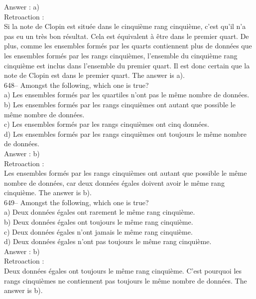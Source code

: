 ﻿\documentclass[letterpaper, 12pt]{article}
\begin{document}
Answer : a)\\

Retroaction : \\
Si la note de Clopin est situ\'ee dans le cinqui\`eme rang cinqui\`eme,
c'est qu'il n'a pas eu un tr\`es bon r\'esultat.  Cela est \'equivalent \`a
\^etre dans le premier quart.  De plus, comme les ensembles form\'es par les
quarts contiennent plus de donn\'ees que les ensembles form\'es par les
rangs cinqui\`emes, l'ensemble du cinqui\`eme rang cinqui\`eme est inclus
dans l'ensemble du premier quart.  Il est donc certain que la note de Clopin
est dans le premier quart.  The answer is a).\\

648-- Amongst the following, which one is true?\\
a) Les ensembles form\'es par les quartiles n'ont pas le m\^eme nombre de
donn\'ees.\\
b) Les ensembles form\'es par les rangs cinqui\`emes ont autant que possible
le m\^eme nombre de donn\'ees.\\
c) Les ensembles form\'es par les rangs cinqui\`emes ont cinq donn\'ees.\\
d) Les ensembles form\'es par les rangs cinqui\`emes ont toujours le m\^eme
nombre de donn\'ees.\\

Answer : b)\\

Retroaction : \\
Les ensembles form\'es par les rangs cinqui\`emes ont autant que possible le
m\^eme nombre de donn\'ees, car deux donn\'ees \'egales doivent avoir le
m\^eme rang cinqui\`eme.  The answer is b).\\

649-- Amongst the following, which one is true?\\
a) Deux donn\'ees \'egales ont rarement le m\^eme rang cinqui\`eme.\\
b) Deux donn\'ees \'egales ont toujours le m\^eme rang cinqui\`eme.\\
c) Deux donn\'ees \'egales n'ont jamais le m\^eme rang cinqui\`eme.\\
d) Deux donn\'ees \'egales n'ont pas toujours le m\^eme rang cinqui\`eme.\\

Answer : b)\\

Retroaction : \\
Deux donn\'ees \'egales ont toujours le m\^eme rang cinqui\`eme.  C'est
pourquoi les rangs cinqui\`emes ne contiennent pas toujours le m\^eme nombre
de donn\'ees.  The answer is b).\\
\end{document}
